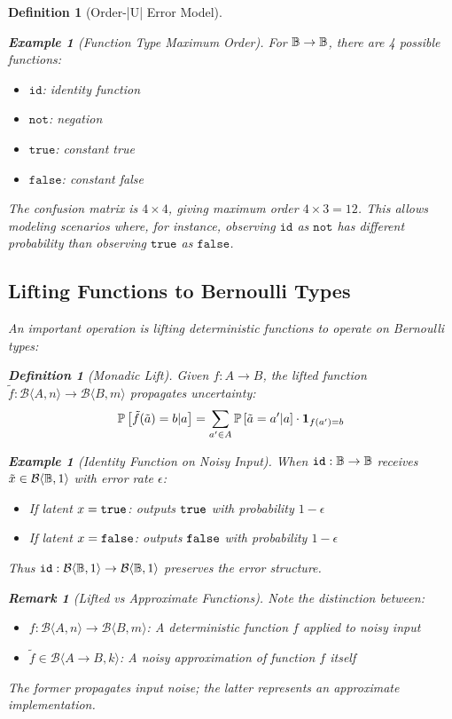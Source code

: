 \documentclass[11pt,final,hidelinks]{article}
\newtheorem{definition}[theorem]{Definition}
\newtheorem{example}[theorem]{Example}
\newtheorem{remark}[theorem]{Remark}
\newcommand{\bernoulli}[2]{\mathcal{B}\langle #1, #2 \rangle}
\begin{document}
\begin{definition}[Order-|U| Error Model]
\begin{example}[Function Type Maximum Order]
For $\mathbb{B} \to \mathbb{B}$, there are 4 possible functions:
\begin{itemize}
    \item $\mathtt{id}$: identity function  
    \item $\mathtt{not}$: negation
    \item $\mathtt{true}$: constant true
    \item $\mathtt{false}$: constant false
\end{itemize}
The confusion matrix is $4 \times 4$, giving maximum order $4 \times 3 = 12$. This allows modeling scenarios where, for instance, observing $\mathtt{id}$ as $\mathtt{not}$ has different probability than observing $\mathtt{true}$ as $\mathtt{false}$.
\end{example}

\subsection{Lifting Functions to Bernoulli Types}

An important operation is lifting deterministic functions to operate on Bernoulli types:

\begin{definition}[Monadic Lift]
Given $f: A \to B$, the lifted function $\tilde{f}: \bernoulli{A}{n} \to \bernoulli{B}{m}$ propagates uncertainty:
\begin{equation}
\mathbb{P}\left[\tilde{f}(\tilde{a}) = b | a\right] = \sum_{a' \in A} \mathbb{P}\left[\tilde{a} = a' | a\right] \cdot \mathbf{1}_{f(a') = b}
\end{equation}
\end{definition}

\begin{example}[Identity Function on Noisy Input]
When $\mathtt{id}: \mathbb{B} \to \mathbb{B}$ receives $\tilde{x} \in \bernoulli{\Bool}{1}$ with error rate $\epsilon$:
\begin{itemize}
    \item If latent $x = \mathtt{true}$: outputs $\mathtt{true}$ with probability $1-\epsilon$
    \item If latent $x = \mathtt{false}$: outputs $\mathtt{false}$ with probability $1-\epsilon$
\end{itemize}
Thus $\mathtt{id}: \bernoulli{\Bool}{1} \to \bernoulli{\Bool}{1}$ preserves the error structure.
\end{example}

\begin{remark}[Lifted vs Approximate Functions]
Note the distinction between:
\begin{itemize}
    \item $f: \bernoulli{A}{n} \to \bernoulli{B}{m}$: A deterministic function $f$ applied to noisy input
    \item $\tilde{f} \in \bernoulli{A \to B}{k}$: A noisy approximation of function $f$ itself
\end{itemize}
The former propagates input noise; the latter represents an approximate implementation.
\end{remark}


\end{definition}
\end{document}
